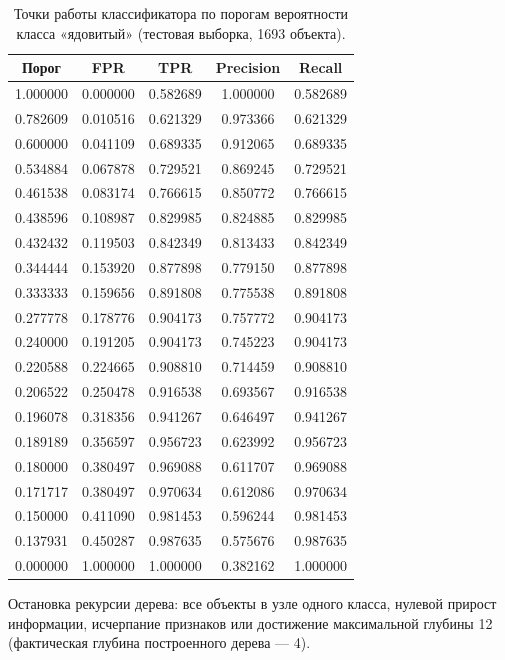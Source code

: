 \documentclass[12pt,a4paper]{article}
\begin{document}
\begin{table}[H]
\centering
\caption{Точки работы классификатора по порогам вероятности класса «ядовитый» (тестовая выборка, 1693 объекта).}
\label{tab:thresholds}
\begin{tabular}{ccccc}
\toprule
Порог & FPR & TPR & Precision & Recall \\
\midrule
1.000000 & 0.000000 & 0.582689 & 1.000000 & 0.582689 \\
0.782609 & 0.010516 & 0.621329 & 0.973366 & 0.621329 \\
0.600000 & 0.041109 & 0.689335 & 0.912065 & 0.689335 \\
0.534884 & 0.067878 & 0.729521 & 0.869245 & 0.729521 \\
0.461538 & 0.083174 & 0.766615 & 0.850772 & 0.766615 \\
0.438596 & 0.108987 & 0.829985 & 0.824885 & 0.829985 \\
0.432432 & 0.119503 & 0.842349 & 0.813433 & 0.842349 \\
0.344444 & 0.153920 & 0.877898 & 0.779150 & 0.877898 \\
0.333333 & 0.159656 & 0.891808 & 0.775538 & 0.891808 \\
0.277778 & 0.178776 & 0.904173 & 0.757772 & 0.904173 \\
0.240000 & 0.191205 & 0.904173 & 0.745223 & 0.904173 \\
0.220588 & 0.224665 & 0.908810 & 0.714459 & 0.908810 \\
0.206522 & 0.250478 & 0.916538 & 0.693567 & 0.916538 \\
0.196078 & 0.318356 & 0.941267 & 0.646497 & 0.941267 \\
0.189189 & 0.356597 & 0.956723 & 0.623992 & 0.956723 \\
0.180000 & 0.380497 & 0.969088 & 0.611707 & 0.969088 \\
0.171717 & 0.380497 & 0.970634 & 0.612086 & 0.970634 \\
0.150000 & 0.411090 & 0.981453 & 0.596244 & 0.981453 \\
0.137931 & 0.450287 & 0.987635 & 0.575676 & 0.987635 \\
0.000000 & 1.000000 & 1.000000 & 0.382162 & 1.000000 \\
\bottomrule
\end{tabular}
\end{table}

Остановка рекурсии дерева: все объекты в узле одного класса, нулевой прирост информации, исчерпание признаков или достижение максимальной глубины 12 (фактическая глубина построенного дерева --- 4).
\end{document}
